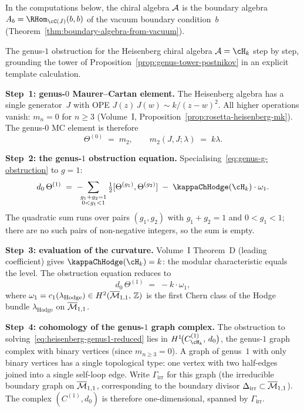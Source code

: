 In the computations below, the chiral algebra $\mathcal{A}$ is the boundary algebra $A_b = \RHom_{\cC(J)}(b,b)$ of the vacuum boundary condition~$b$ (Theorem~\ref{thm:boundary-algebra-from-vacuum}).

\begin{computation}
\label{comp:heisenberg-genus1-obstruction}%
%
%
The genus-$1$ obstruction for the Heisenberg chiral
algebra $\cA = \cH_k$ step by step, grounding the tower of
Proposition~\ref{prop:genus-tower-postnikov} in an explicit
template calculation.

\smallskip
\noindent
\textbf{Step~1: genus-$0$ Maurer--Cartan element.}
The Heisenberg algebra has a single generator~$J$ with OPE
$J(z)\,J(w) \sim k/(z{-}w)^2$. All higher operations vanish:
$m_n = 0$ for $n \ge 3$
(Volume~I, Proposition~\ref{prop:rosetta-heisenberg-mk}).
The genus-$0$ MC element is therefore
\[
\Theta^{(0)} \;=\; m_2,
\qquad
m_2(J,J;\lambda) \;=\; k\lambda.
\]

\smallskip
\noindent
\textbf{Step~2: the genus-$1$ obstruction equation.}
Specialising~\eqref{eq:genus-g-obstruction} to $g = 1$:
\begin{equation}\label{eq:heisenberg-genus1-obstruction}
d_0\,\Theta^{(1)}
\;=\;
-\!\!\!\sum_{\substack{g_1 + g_2 = 1 \\ 0 < g_1 < 1}}
\tfrac{1}{2}[\Theta^{(g_1)},\Theta^{(g_2)}]
\;-\;
\kappaChHodge(\cH_k) \cdot \omega_1.
\end{equation}
The quadratic sum runs over pairs $(g_1,g_2)$ with
$g_1 + g_2 = 1$ and $0 < g_1 < 1$; there are no such pairs
of non-negative integers, so the sum is empty.

\smallskip
\noindent
\textbf{Step~3: evaluation of the curvature.}
Volume~I Theorem~D (leading coefficient) gives
$\kappaChHodge(\cH_k) = k$: the modular characteristic equals the
level. The obstruction equation reduces to
\begin{equation}\label{eq:heisenberg-genus1-reduced}
d_0\,\Theta^{(1)} \;=\; -k \cdot \omega_1,
\end{equation}
where
$\omega_1 = c_1(\lambda_{\mathrm{Hodge}})
\in H^2(\overline{\mathcal{M}}_{1,1},\,\mathbb{Z})$
is the first Chern class of the Hodge bundle
$\lambda_{\mathrm{Hodge}}$ on $\overline{\mathcal{M}}_{1,1}$.

\smallskip
\noindent
\textbf{Step~4: cohomology of the genus-$1$ graph complex.}
The obstruction to solving~\eqref{eq:heisenberg-genus1-reduced}
lies in
$H^1\!\bigl(C^{(1)}_{\cH_k},\, d_0\bigr)$,
the genus-$1$ graph complex with binary vertices
(since $m_{n \ge 3} = 0$). A graph of genus~$1$ with only
binary vertices has a single topological type: one vertex with
two half-edges joined into a single self-loop edge. Write
$\Gamma_{\mathrm{irr}}$ for this graph (the irreducible boundary
graph on $\overline{\mathcal{M}}_{1,1}$, corresponding to the boundary divisor
$\Delta_{\mathrm{irr}} \subset \overline{\mathcal{M}}_{1,1}$). The complex
$(C^{(1)},d_0)$ is therefore one-dimensional, spanned by
$\Gamma_{\mathrm{irr}}$.


\end{computation}
